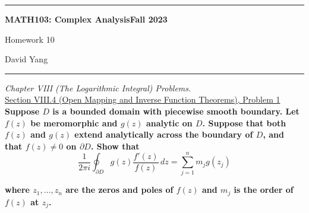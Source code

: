 \documentclass[11pt]{article}
\theoremstyle{definition}
\begin{document}
	\hrule
	\begin{center}
        \textbf{MATH103: Complex Analysis}\hfill \textbf{Fall 2023}\newline


		{\Large Homework 10}

		David Yang
	\end{center}

\hrule

\vspace{1em}


\textit{Chapter VIII (The Logarithmic Integral) Problems.} \\

\underline{Section VIII.4 (Open Mapping and Inverse Function Theorems), Problem 1}\\

\textbf{Suppose $D$ is a bounded domain with piecewise smooth boundary. Let $f(z)$ be meromorphic and $g(z)$ analytic on $D$. Suppose that both $f(z)$ and $g(z)$ extend analytically
across the boundary of $D$, and that $f(z) \neq 0$ on $\partial D$. Show that}
\[ \frac{1}{2\pi i} \oint_{\partial D} g(z) \frac{f'(z)}{f(z)} \, dz = \sum \limits_{j=1}^n m_j g(z_j) \]

\textbf{where $z_1, \dots, z_n$ are the zeros and poles of $f(z)$ and $m_j$ is the order of $f(z)$ at $z_j$.}
\end{document}
